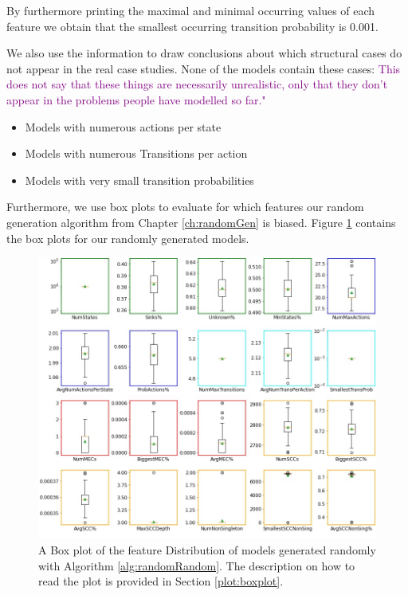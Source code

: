 By furthermore printing the maximal and minimal occurring values of each feature we obtain that the smallest occurring transition probability is 0.001.

We also use the information to draw conclusions about which structural cases do not appear in the real case studies. 
None of the models contain these cases: \textcolor{purple}{This does not say that these things are necessarily unrealistic, only that they don't appear in the problems people have modelled so far."}
\begin{itemize}
    \item Models with numerous actions per state
    \item Models with numerous Transitions per action
    \item Models with very small transition probabilities
\end{itemize}
\FloatBarrier
Furthermore, we use box plots to evaluate for which features our random generation algorithm from Chapter \ref{ch:randomGen} is biased.
Figure \ref{fig:Random_FeatureDistribution} contains the box plots for our randomly generated models.
\begin{figure}[h!]
    \centering
    \includegraphics[width=1\textwidth]{figures/RandomRandom_FeatureDistribution.jpg}
    \caption[Feature Distribution of random models]{
        A Box plot of the feature Distribution of models generated randomly with Algorithm \ref{alg:randomRandom}. The description on how to read the plot is provided in Section \ref{plot:boxplot}.
    }
    \label{fig:Random_FeatureDistribution}
\end{figure}
\FloatBarrier

